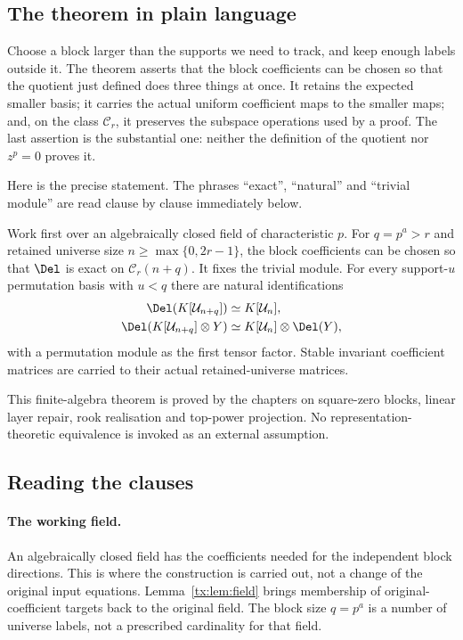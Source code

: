 \subsection*{The theorem in plain language}
Choose a block larger than the supports we need to track, and keep
enough labels outside it. The theorem asserts that the block
coefficients can be chosen so that the quotient just defined does
three things at once. It retains the expected smaller basis; it
carries the actual uniform coefficient maps to the smaller maps;
and, on the class $\mathcal C_r$, it preserves the subspace
operations used by a proof. The last assertion is the substantial
one: neither the definition of the quotient nor $z^p=0$ proves it.

Here is the precise statement. The phrases ``exact'', ``natural''
and ``trivial module'' are read clause by clause immediately below.

\begin{theorem}\label{tx:thm:deletion}
Work first over an algebraically closed field of characteristic $p$.
For $q=p^a>r$ and retained universe size $n\ge\max\{0,2r-1\}$, the block
coefficients can be chosen so that $\Del$ is exact on $\mathcal C_r(n+q)$.
It fixes the trivial module. For every support-$u$ permutation basis with
$u<q$ there are natural identifications
\begin{align}
 \Del(K[\mathcal U_{n+q}])&\simeq K[\mathcal U_n],\label{tx:eq:permdelete}\\
 \Del(K[\mathcal U_{n+q}]\otimes Y)&\simeq
                  K[\mathcal U_n]\otimes\Del(Y),\label{tx:eq:tensordelete}
\end{align}
with a permutation module as the first tensor factor. Stable invariant
coefficient matrices are carried to their actual retained-universe matrices.
\end{theorem}

This finite-algebra theorem is proved by the chapters on
square-zero blocks, linear layer repair, rook realisation and top-power
projection. No representation-theoretic equivalence is
invoked as an external assumption.

\subsection*{Reading the clauses}
\paragraph{The working field.}
An algebraically closed field has the coefficients needed for the
independent block directions. This is where the construction is
carried out, not a change of the original input equations.
Lemma~\ref{tx:lem:field} brings membership of original-coefficient
targets back to the original field. The block size $q=p^a$ is a
number of universe labels, not a prescribed cardinality for that
field.

